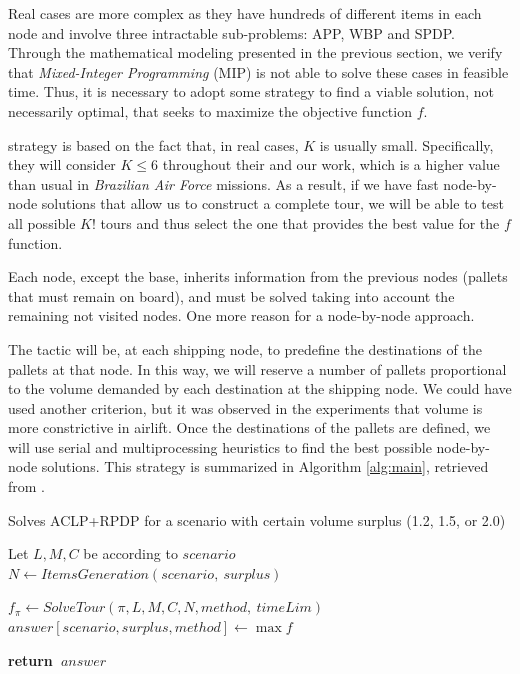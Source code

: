 \documentclass[preprint,authoryear]{elsarticle}
\renewcommand{\Return}{\State \bf {return}~}
\begin{document}
Real cases are more complex as they have hundreds of different items in each node and involve three intractable sub-problems: APP, WBP and SPDP. Through the mathematical modeling presented in the previous section, we verify that {\it Mixed-Integer Programming}\/ (MIP) is not able to solve these cases in feasible time. Thus, it is necessary to adopt some strategy to find a viable solution, not necessarily optimal, that seeks to maximize the objective function $f$.

\cite{MesquitaSanches2023} strategy is based on the fact that, in real cases, $K$\/ is usually small. Specifically, they will consider $K \leq 6$\/ throughout their and our work, which is a higher value than usual in {\it Brazilian Air Force} missions. As a result, if we have fast node-by-node solutions that allow us to construct a complete tour, we will be able to test all possible $K!$\/ tours and thus select the one that provides the best value for the $f$\/ function.

Each node, except the base, inherits information from the previous nodes (pallets that must remain on board), and must be solved taking into account the remaining not visited nodes. One more reason for a node-by-node approach.

The tactic will be, at each shipping node, to predefine the destinations of the pallets at that node. In this way, we will reserve a number of pallets proportional to the volume demanded by each destination at the shipping node. We could have used another criterion, but it was observed in the experiments that volume is more constrictive in airlift. Once the destinations of the pallets are defined, we will use serial and multiprocessing heuristics to find the best possible node-by-node solutions. This strategy is summarized in Algorithm \ref{alg:main}, retrieved from \cite{MesquitaSanches2023}.


\begin{algorithm}[H]
	\caption{Solves ACLP+RPDP for a scenario with certain volume surplus (1.2, 1.5, or 2.0)}  \label{alg:main}
	\begin{algorithmic}[1]
		
		
		\State Let $L, M, C$ be according to $scenario$ \label{main:LMC}
		\State $N \gets ItemsGeneration(scenario,\ surplus)$ \label{main:items}
				
			 \label{main:loop1}
				\State $f_{\pi} \gets SolveTour(\pi, L, M, C, N, method, \ timeLim )$ \label{main:method}
			\EndFor \label{main:loop2}
			\State $answer[scenario,surplus,method] \gets \max f$ \label{main:f}
		\EndFor
		
		\Return $answer$
		
		\EndProcedure
	\end{algorithmic}
\end{algorithm}
\end{document}
